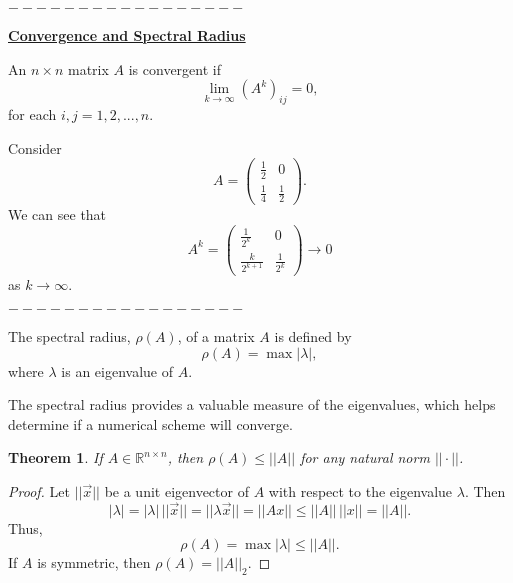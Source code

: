 \documentclass[12pt]{article}
\newcommand{\vecx}{\ensuremath{\vec{x}}}
\newtheorem{theorem}{Theorem}
\newenvironment{definition}[1][Definition]{\begin{trivlist}
\item[\hskip \labelsep {\bfseries #1}]}{\end{trivlist}}
\newenvironment{example}[1][Example]{\begin{trivlist}
\item[\hskip \labelsep {\bfseries #1}]}{\end{trivlist}}
\begin{document}
\begin{center}$-----------------$\end{center}
\vspace*{1em}


\underline{\textbf{Convergence and Spectral Radius}}

\begin{definition}
An $n\times n$ matrix $A$ is convergent if
\[
\lim_{k\rightarrow\infty}(A^k)_{ij} = 0,
\]
for each  $i,j=1,2,...,n$.
\end{definition}

\vspace*{1em}

\begin{example}
Consider 
\[
A = \left(\begin{array}{cc}
\frac{1}{2} & 0 \\ \frac{1}{4} & \frac{1}{2}
\end{array}
\right).
\]
We can see that
\[
A^k =\left(\begin{array}{cc}
 \frac{1}{2^k} & 0 \\ \frac{k}{2^{k+1}} & \frac{1}{2^k}
\end{array}
\right) \rightarrow 0
\]
as $k\rightarrow \infty$.
\end{example}

\begin{center}$-----------------$\end{center}
\vspace*{1em}

\begin{definition}
The spectral radius, $\rho(A)$, of a matrix $A$ is defined by
\[
\rho(A) = \max |\lambda|,
\]
where $\lambda$ is an eigenvalue of $A$. 
\end{definition}

\vspace*{1em}

The spectral radius provides a valuable measure of the eigenvalues, which helps determine if a numerical scheme will converge.

\vspace*{1em}

\begin{theorem}
If $A \in \mathbb{R}^{n\times n}$, then $\rho(A)\leq ||A||$ for any natural norm $||\cdot||$.
\end{theorem}

\begin{proof}
Let $||\vecx||$ be a unit eigenvector of $A$ with respect to the eigenvalue $\lambda$. Then
\[
|\lambda| = |\lambda|\, ||\vecx|| = ||\lambda\vecx|| = ||Ax|| \leq ||A||\, ||x|| = ||A||.
\]
Thus,
\[
\rho(A) = \max|\lambda|\leq ||A||.
\]
If $A$ is symmetric, then $\rho(A) = ||A||_2$.
\end{proof}
\end{document}
